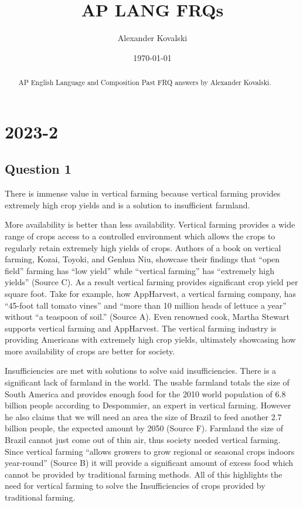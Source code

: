 \documentclass[10pt]{article}
\title{AP LANG FRQs}
\author{Alexander Kovalski}
\date{\today}
\begin{document}
\maketitle

\begin{abstract}

AP English Language and Composition Past FRQ answers by Alexander Kovalski.

\end{abstract}

\tableofcontents

%
\section{2023-2}
\subsection{Question 1}

There is immense value in vertical farming because vertical farming provides extremely high crop yields and is a solution to insufficient farmland.

More availability is better than less availability. Vertical farming provides a wide range of crops access to a controlled environment which allows the crops to regularly retain extremely high yields of crops. Authors of a book on vertical farming, Kozai, Toyoki, and Genhua Niu, showcase their findings that “open field” farming has “low yield” while “vertical farming” has “extremely high yields” (Source C). As a result vertical farming provides significant crop yield per square foot. Take for example, how AppHarvest, a vertical farming company, has “45-foot tall tomato vines” and “more than 10 million heads of lettuce a year” without “a teaspoon of soil.” (Source A). Even renowned cook, Martha Stewart supports vertical farming and AppHarvest. The vertical farming industry is providing Americans with extremely high crop yields, ultimately showcasing how more availability of crops are better for society.

Insufficiencies are met with solutions to solve said insufficiencies. There is a significant lack of farmland in the world. The usable farmland totals the size of South America and provides enough food for the 2010 world population of 6.8 billion people according to Despommier, an expert in vertical farming. However he also claims that we will need an area the size of Brazil to feed another 2.7 billion people, the expected amount by 2050 (Source F). Farmland the size of Brazil cannot just come out of thin air, thus society needed vertical farming. Since vertical farming “allows growers to grow regional or seasonal crops indoors year-round” (Source B) it will provide a significant amount of excess food which cannot be provided by traditional farming methods. All of this highlights the need for vertical farming to solve the Insufficiencies of crops provided by traditional farming.
\end{document}
